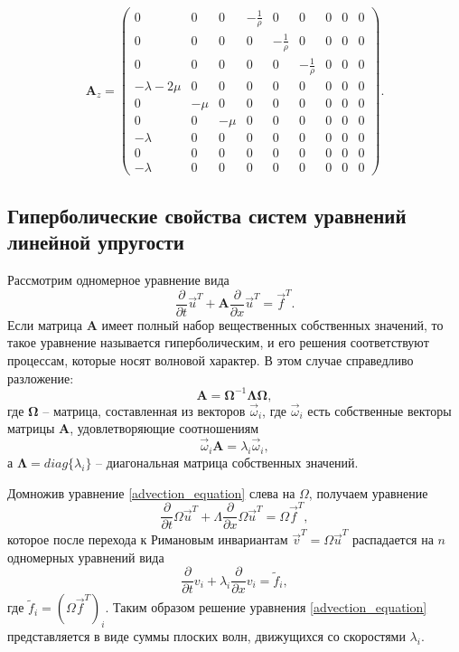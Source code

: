 \begin{displaymath}
\mathbf{A}_z =
\left( \begin{array}{cccccccccccc}
0 & 0 & 0 & -\frac 1 \rho & 0 & 0 & 0 & 0 & 0 \\ 
0 & 0 & 0 & 0 & -\frac 1 \rho & 0 & 0 & 0 & 0 \\ 
0 & 0 & 0 & 0 & 0 & -\frac 1 \rho & 0 & 0 & 0 \\ 
-\lambda-2\mu & 0 & 0 & 0 & 0 & 0 & 0 & 0 & 0 \\ 
0 & -\mu & 0 & 0 & 0 & 0 & 0 & 0 & 0 \\ 
0 & 0 & -\mu & 0 & 0 & 0 & 0 & 0 & 0 \\ 
-\lambda & 0 & 0 & 0 & 0 & 0 & 0 & 0 & 0 \\ 
0 & 0 & 0 & 0 & 0 & 0 & 0 & 0 & 0 \\ 
-\lambda & 0 & 0 & 0 & 0 & 0 & 0 & 0 & 0  
\end{array} \right).
\end{displaymath}
\subsection{Гиперболические свойства систем уравнений линейной упругости}
Рассмотрим одномерное уравнение вида
\begin{equation}
\frac{\partial}{\partial{t}}\vec{u}^T+\mathbf{A}\frac{\partial}{\partial{x}}\vec{u}^T=\vec{f}^T.
\label{advection_equation}
\end{equation}
Если матрица $\mathbf{A}$ имеет полный набор вещественных собственных значений, 
то такое уравнение называется гиперболическим, и его решения соответствуют 
процессам, которые носят волновой характер. В этом случае справедливо разложение:
$$\mathbf{A}=\mathbf\Omega^{-1}\mathbf\Lambda\mathbf\Omega,$$
где $\mathbf\Omega$ -- матрица, составленная из векторов ${\vec\omega_i}$, где
$\vec\omega_i$ есть собственные векторы матрицы $\mathbf A$,
удовлетворяющие соотношениям
$$\vec\omega_i\mathbf A=\lambda_i\vec\omega_i,$$
а $\mathbf\Lambda=diag\{\lambda_i\}$ -- диагональная матрица собственных
значений.

Домножив уравнение \ref{advection_equation} слева на $\Omega$, получаем
уравнение
$$\frac{\partial}{\partial t}\Omega{\vec u}^T+
\Lambda\frac{\partial}{\partial x}\Omega{\vec u}^T=\Omega{\vec f}^T,$$
которое после перехода к Римановым инвариантам ${\vec v}^T=\Omega{\vec u}^T$
распадается на $n$ одномерных уравнений вида
\begin{equation}
\frac{\partial}{\partial t}{v_i}+\lambda_i\frac{\partial}{\partial
x}{v_i}={{\tilde f}_i},
\label{advection_equation_splitted}
\end{equation}
где ${{\tilde f}_i}=(\Omega{\vec f}^T)_i$.
Таким образом решение уравнения \ref{advection_equation} представляется в виде
суммы плоских волн, движущихся со скоростями $\lambda_i$.
